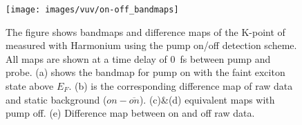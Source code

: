 \begin{figure}
	\centering
	\texttt{[image: images/vuv/on-off\_bandmaps]}
	\caption{The figure shows bandmaps and difference maps of the K-point of  measured with Harmonium using the pump on/off detection scheme. All maps are shown at a time delay of \qty{0}{\femto\second} between pump and probe.
	(a) shows the bandmap for pump on with the faint exciton state above $E_F$. (b) is the corresponding difference map of raw data and static background ($on-\overline{on}$). (c)\&(d) equivalent maps with pump off. (e) Difference map between on and off raw data.}
	\label{fig:on-offbandmaps}
\end{figure}
